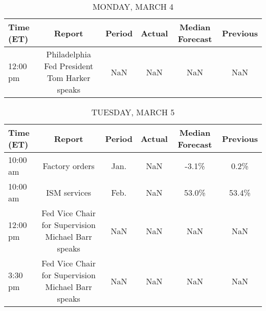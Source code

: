 \documentclass{article}%
\begin{document}
%
\normalsize%


\begin{table}[htbp]%
\caption{MONDAY, MARCH 4}%
\centering%
\begin{adjustbox}{width=1\textwidth}%
\begin{tabular}{lccccc}
\toprule
Time (ET) &                                       Report & Period & Actual & Median Forecast & Previous \\
\midrule
 12:00 pm & Philadelphia Fed President Tom Harker speaks &    NaN &    NaN &             NaN &      NaN \\
\bottomrule
\end{tabular}
%
\end{adjustbox}%
\end{table}

%


\begin{table}[htbp]%
\caption{TUESDAY, MARCH 5}%
\centering%
\begin{adjustbox}{width=1\textwidth}%
\begin{tabular}{lccccc}
\toprule
Time (ET) &                                             Report & Period & Actual & Median Forecast & Previous \\
\midrule
 10:00 am &                                     Factory orders &   Jan. &    NaN &           -3.1\% &     0.2\% \\
 10:00 am &                                       ISM services &   Feb. &    NaN &           53.0\% &    53.4\% \\
 12:00 pm & Fed Vice Chair for Supervision Michael Barr speaks &    NaN &    NaN &             NaN &      NaN \\
  3:30 pm & Fed Vice Chair for Supervision Michael Barr speaks &    NaN &    NaN &             NaN &      NaN \\
\bottomrule
\end{tabular}
%
\end{adjustbox}%
\end{table}

%
\end{document}

